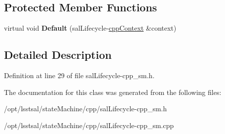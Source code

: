 \subsection*{Protected Member Functions}
\begin{DoxyCompactItemize}
\item 
\hypertarget{classsal_lifecycle_state_a7a2cd66b55e59dd8d1cab519ea90544d}{virtual void {\bfseries Default} (sal\-Lifecycle-\/\hyperlink{classcpp_context}{cpp\-Context} \&context)}\label{classsal_lifecycle_state_a7a2cd66b55e59dd8d1cab519ea90544d}

\end{DoxyCompactItemize}


\subsection{Detailed Description}


Definition at line 29 of file sal\-Lifecycle-\/cpp\-\_\-sm.\-h.



The documentation for this class was generated from the following files\-:\begin{DoxyCompactItemize}
\item 
/opt/lsstsal/state\-Machine/cpp/sal\-Lifecycle-\/cpp\-\_\-sm.\-h\item 
/opt/lsstsal/state\-Machine/cpp/sal\-Lifecycle-\/cpp\-\_\-sm.\-cpp\end{DoxyCompactItemize}
